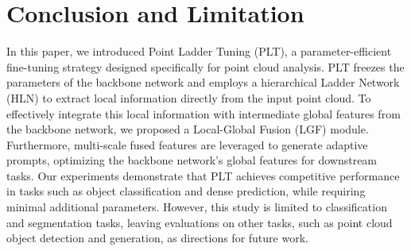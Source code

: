 \section{Conclusion and Limitation}
\label{sec:conclusion&limitation}

In this paper, we introduced Point Ladder Tuning (PLT), a parameter-efficient fine-tuning strategy designed specifically for point cloud analysis. PLT freezes the parameters of the backbone network and employs a hierarchical Ladder Network (HLN) to extract local information directly from the input point cloud. To effectively integrate this local information with intermediate global features from the backbone network, we proposed a Local-Global Fusion (LGF) module. Furthermore, multi-scale fused features are leveraged to generate adaptive prompts, optimizing the backbone network's global features for downstream tasks. Our experiments demonstrate that PLT achieves competitive performance in tasks such as object classification and dense prediction, while requiring minimal additional parameters. However, this study is limited to classification and segmentation tasks, leaving evaluations on other tasks, such as point cloud object detection and generation, as directions for future work.
